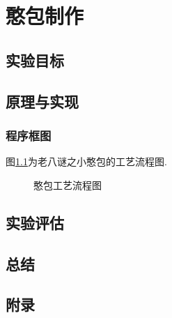 \chapter{憨包制作}
\section{实验目标}
\section{原理与实现}
\subsection{程序框图}
图\ref{FC1}为老八谜之小憨包的工艺流程图.
\begin{figure}[htbp]
    \centering
    \resizebox{0.5\textwidth}{!}{%
    
    }%
    \caption{憨包工艺流程图}
    \label{FC1}
\end{figure}
\section{实验评估}
\section{总结}
\section{附录}

